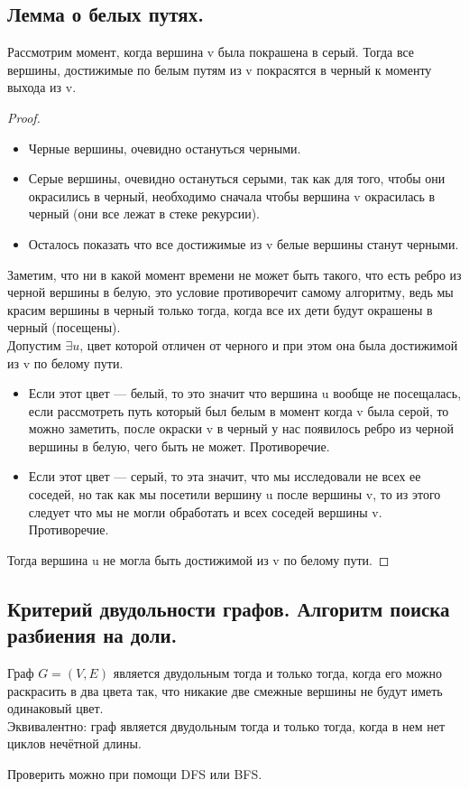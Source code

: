 \documentclass[a4paper,14pt]{article}
\begin{document}
    \subsection{Лемма о белых путях.}
    \begin{lemma}
        Рассмотрим момент, когда вершина v была покрашена в серый. Тогда
все вершины, достижимые по белым путям из v покрасятся в черный к
моменту выхода из v.
    \end{lemma}
    \begin{proof}
        \begin{itemize}
            \item Черные вершины, очевидно остануться черными.
            \item Серые вершины, очевидно остануться серыми, так как для того,
            чтобы они окрасились в черный, необходимо сначала чтобы вершина
            v окрасилась в черный (они все лежат в стеке рекурсии).
            \item Осталось показать что все достижимые из v белые вершины станут
            черными.
        \end{itemize}
        Заметим, что ни в какой момент времени не может быть такого, что есть
ребро из черной вершины в белую, это условие противоречит самому
алгоритму, ведь мы красим вершины в черный только тогда, когда все их
дети будут окрашены в черный (посещены). \\
Допустим $\exists u$, цвет которой отличен от черного и при этом она была
достижимой из v по белому пути.
        \begin{itemize}
            \item Если этот цвет — белый, то это значит что вершина u вообще не
            посещалась, если рассмотреть путь который был белым в момент
            когда v была серой, то можно заметить, после окраски v в черный у
            нас появилось ребро из черной вершины в белую, чего быть не
            может. Противоречие.
            \item Если этот цвет — серый, то эта значит, что мы исследовали не всех
            ее соседей, но так как мы посетили вершину u после вершины v, то
            из этого следует что мы не могли обработать и всех соседей
            вершины v. Противоречие.
        \end{itemize}
    Тогда вершина u не могла быть достижимой из v по белому пути.
    \end{proof}
    \subsection{Критерий двудольности графов. Алгоритм поиска разбиения на доли.}
    \begin{theorem}
        Граф $G = (V, E)$ является двудольным тогда и только тогда, когда
        его можно раскрасить в два цвета так, что никакие две смежные
        вершины не будут иметь одинаковый цвет. \\
        Эквивалентно: граф является двудольным тогда и только тогда, когда
        в нем нет циклов нечётной длины.
    \end{theorem}
    Проверить можно при помощи DFS или BFS.
\end{document}
